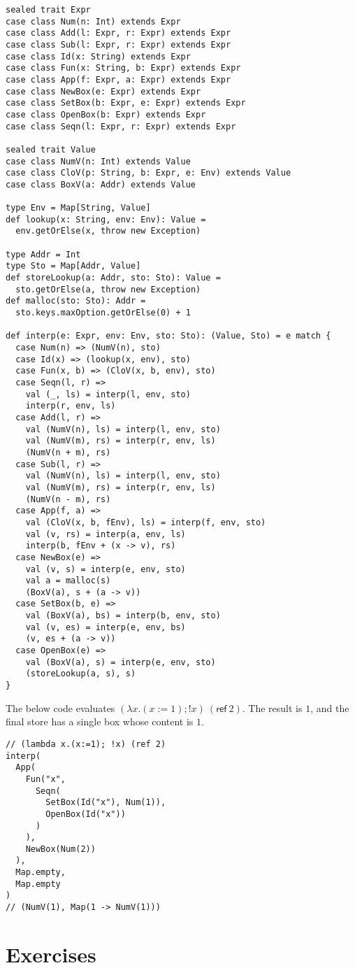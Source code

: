 \begin{verbatim}
sealed trait Expr
case class Num(n: Int) extends Expr
case class Add(l: Expr, r: Expr) extends Expr
case class Sub(l: Expr, r: Expr) extends Expr
case class Id(x: String) extends Expr
case class Fun(x: String, b: Expr) extends Expr
case class App(f: Expr, a: Expr) extends Expr
case class NewBox(e: Expr) extends Expr
case class SetBox(b: Expr, e: Expr) extends Expr
case class OpenBox(b: Expr) extends Expr
case class Seqn(l: Expr, r: Expr) extends Expr

sealed trait Value
case class NumV(n: Int) extends Value
case class CloV(p: String, b: Expr, e: Env) extends Value
case class BoxV(a: Addr) extends Value

type Env = Map[String, Value]
def lookup(x: String, env: Env): Value =
  env.getOrElse(x, throw new Exception)

type Addr = Int
type Sto = Map[Addr, Value]
def storeLookup(a: Addr, sto: Sto): Value =
  sto.getOrElse(a, throw new Exception)
def malloc(sto: Sto): Addr =
  sto.keys.maxOption.getOrElse(0) + 1

def interp(e: Expr, env: Env, sto: Sto): (Value, Sto) = e match {
  case Num(n) => (NumV(n), sto)
  case Id(x) => (lookup(x, env), sto)
  case Fun(x, b) => (CloV(x, b, env), sto)
  case Seqn(l, r) =>
    val (_, ls) = interp(l, env, sto)
    interp(r, env, ls)
  case Add(l, r) =>
    val (NumV(n), ls) = interp(l, env, sto)
    val (NumV(m), rs) = interp(r, env, ls)
    (NumV(n + m), rs)
  case Sub(l, r) =>
    val (NumV(n), ls) = interp(l, env, sto)
    val (NumV(m), rs) = interp(r, env, ls)
    (NumV(n - m), rs)
  case App(f, a) =>
    val (CloV(x, b, fEnv), ls) = interp(f, env, sto)
    val (v, rs) = interp(a, env, ls)
    interp(b, fEnv + (x -> v), rs)
  case NewBox(e) =>
    val (v, s) = interp(e, env, sto)
    val a = malloc(s)
    (BoxV(a), s + (a -> v))
  case SetBox(b, e) =>
    val (BoxV(a), bs) = interp(b, env, sto)
    val (v, es) = interp(e, env, bs)
    (v, es + (a -> v))
  case OpenBox(e) =>
    val (BoxV(a), s) = interp(e, env, sto)
    (storeLookup(a, s), s)
}
\end{verbatim}

The below code evaluates \( (\lambda x.(x:=1);!x)\ (\textsf{ref}\ 2) \). The
result is \(1\), and the final store has a single box whose content is \(1\).

\begin{verbatim}
// (lambda x.(x:=1); !x) (ref 2)
interp(
  App(
    Fun("x",
      Seqn(
        SetBox(Id("x"), Num(1)),
        OpenBox(Id("x"))
      )
    ),
    NewBox(Num(2))
  ),
  Map.empty,
  Map.empty
)
// (NumV(1), Map(1 -> NumV(1)))
\end{verbatim}

\section{Exercises}
